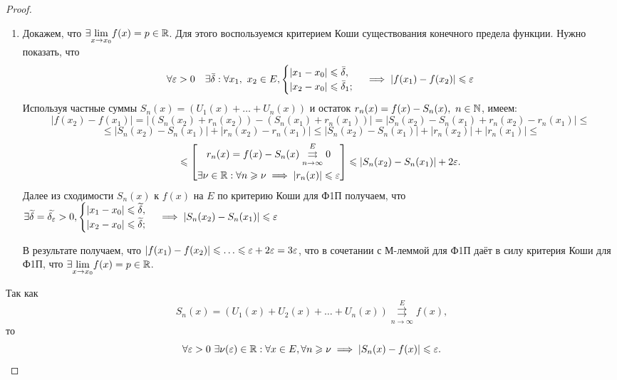 \documentclass[../../main.tex]{subfiles}
\begin{document}
\begin{proof}
	\;
	
	\begin{enumerate}
		\item Докажем, что $\exists \underset{x \to x_0}{\lim} f(x) = 
	p \in \mathbb{R}$. Для этого воспользуемся критерием Коши существования 
	конечного предела функции. Нужно показать, что
	\begin{equation}
	\label{lec2:17}
	\forall \varepsilon > 0 \quad \exists \bar\delta :
	\forall x_1,\ x_2 \in E, 
	\begin{cases}
	|x_1 - x_0| \leqslant \bar\delta, \\
	|x_2 - x_0| \leqslant \bar\delta_1;
	\end{cases} \implies
	|f(x_1) - f(x_2)| \leqslant \varepsilon
	\end{equation}
	Используя частные суммы $S_n(x) = (U_1(x) + \ldots + U_n(x))$ и 
	остаток $r_n(x) = f(x) - S_n(x),\ n \in \mathbb{N}$, имеем:
	\[
	|f(x_2) - f(x_1)| = |(S_n(x_2) + r_n(x_2)) - (S_n(x_1) + r_n(x_1))| =
	|S_n(x_2) - S_n(x_1) + r_n(x_2) - r_n(x_1)| \leq 
	\]
	\[
	\leq |S_n(x_2) - S_n(x_1)| + |r_n(x_2) - r_n(x_1)| \leq 
	|S_n(x_2) - S_n(x_1)| + |r_n(x_2)| + |r_n(x_1)| \leq
	\]
	\[
	\leqslant 
	\left[
	\begin{gathered}
	r_n(x) = f(x) - S_n(x) \overset{E}
	{\underset{n \to \infty}\rightrightarrows} 0 \\
	\exists \nu \in \mathbb{R} : \forall n \geqslant \nu \implies
	|r_n(x)| \leqslant \varepsilon
	\end{gathered}
	\right] \leqslant |S_n(x_2) - S_n(x_1)| + 2\varepsilon.
	\]
	Далее из сходимости $S_n(x)$ к $f(x)$ на $E$ по критерию Коши для Ф1П
	получаем, что $\exists \widetilde{\delta} = \widetilde{\delta_\varepsilon} > 0,
	\begin{cases} 
	|x_1 - x_0| \leqslant \widetilde{\delta}, \\
	|x_2 - x_0| \leqslant \widetilde{\delta};
	\end{cases} \implies
	|S_n(x_2) - S_n(x_1)| \leqslant \varepsilon$ 
	
	В результате получаем, что $|f(x_1) - f(x_2)| \leqslant \ldots \leqslant 
	\varepsilon + 2\varepsilon = 3\varepsilon$, что в сочетании с М-леммой для Ф1П даёт
	в силу критерия Коши для Ф1П, что $\exists \underset{x \to x_0}{\lim}
	f(x) = p \in \mathbb{R}$.
	\end{enumerate}
	
	Так как 
\[
S_n(x) = (U_1(x) + U_2(x) + \ldots + U_n(x)) \overset{E}{\underset{n \to 
\infty}\rightrightarrows} f(x),
\]
 то
\begin{equation} \label{eq:18}
	\forall \varepsilon > 0 \ \exists \nu(\varepsilon) \in \mathbb{R} : \forall x \in E, \forall n \geqslant 
	\nu \implies |S_n(x) - f(x)| \leqslant \varepsilon.
\end{equation}


\end{proof}
\end{document}
